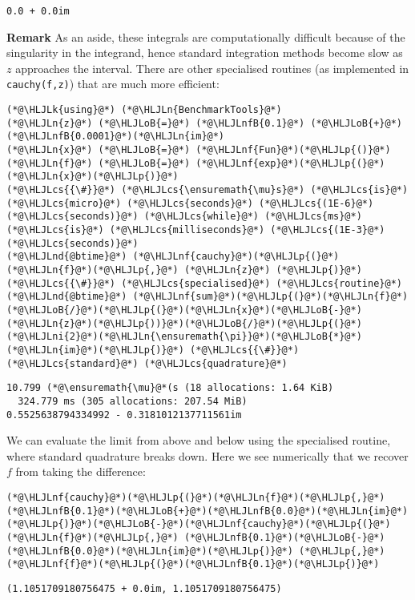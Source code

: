 \documentclass[12pt,a4paper]{article}
\newcommand{\HLJLk}[1]{\textcolor[RGB]{148,91,176}{\textbf{#1}}}
\newcommand{\HLJLn}[1]{#1}
\newcommand{\HLJLnd}[1]{\textcolor[RGB]{214,102,97}{#1}}
\newcommand{\HLJLnf}[1]{\textcolor[RGB]{66,102,213}{#1}}
\newcommand{\HLJLnfB}[1]{\textcolor[RGB]{59,151,46}{#1}}
\newcommand{\HLJLni}[1]{\textcolor[RGB]{59,151,46}{#1}}
\newcommand{\HLJLoB}[1]{\textcolor[RGB]{102,102,102}{\textbf{#1}}}
\newcommand{\HLJLp}[1]{#1}
\newcommand{\HLJLcs}[1]{\textcolor[RGB]{153,153,119}{\textit{#1}}}
\begin{document}
\begin{lstlisting}
0.0 + 0.0im
\end{lstlisting}


\textbf{Remark} As an aside, these integrals are computationally difficult because of the singularity in the integrand, hence standard integration methods become slow as $z$ approaches the interval. There are other specialised routines (as implemented in \texttt{cauchy(f,z)}) that are much more efficient:


\begin{lstlisting}
(*@\HLJLk{using}@*) (*@\HLJLn{BenchmarkTools}@*)
(*@\HLJLn{z}@*) (*@\HLJLoB{=}@*) (*@\HLJLnfB{0.1}@*) (*@\HLJLoB{+}@*)(*@\HLJLnfB{0.0001}@*)(*@\HLJLn{im}@*)
(*@\HLJLn{x}@*) (*@\HLJLoB{=}@*) (*@\HLJLnf{Fun}@*)(*@\HLJLp{()}@*)
(*@\HLJLn{f}@*) (*@\HLJLoB{=}@*) (*@\HLJLnf{exp}@*)(*@\HLJLp{(}@*)(*@\HLJLn{x}@*)(*@\HLJLp{)}@*)
(*@\HLJLcs{{\#}}@*) (*@\HLJLcs{\ensuremath{\mu}s}@*) (*@\HLJLcs{is}@*) (*@\HLJLcs{micro}@*) (*@\HLJLcs{seconds}@*) (*@\HLJLcs{(1E-6}@*) (*@\HLJLcs{seconds)}@*) (*@\HLJLcs{while}@*) (*@\HLJLcs{ms}@*) (*@\HLJLcs{is}@*) (*@\HLJLcs{milliseconds}@*) (*@\HLJLcs{(1E-3}@*) (*@\HLJLcs{seconds)}@*)
(*@\HLJLnd{@btime}@*) (*@\HLJLnf{cauchy}@*)(*@\HLJLp{(}@*)(*@\HLJLn{f}@*)(*@\HLJLp{,}@*) (*@\HLJLn{z}@*) (*@\HLJLp{)}@*) (*@\HLJLcs{{\#}}@*) (*@\HLJLcs{specialised}@*) (*@\HLJLcs{routine}@*)
(*@\HLJLnd{@btime}@*) (*@\HLJLnf{sum}@*)(*@\HLJLp{(}@*)(*@\HLJLn{f}@*)(*@\HLJLoB{/}@*)(*@\HLJLp{(}@*)(*@\HLJLn{x}@*)(*@\HLJLoB{-}@*)(*@\HLJLn{z}@*)(*@\HLJLp{))}@*)(*@\HLJLoB{/}@*)(*@\HLJLp{(}@*)(*@\HLJLni{2}@*)(*@\HLJLn{\ensuremath{\pi}}@*)(*@\HLJLoB{*}@*)(*@\HLJLn{im}@*)(*@\HLJLp{)}@*) (*@\HLJLcs{{\#}}@*) (*@\HLJLcs{standard}@*) (*@\HLJLcs{quadrature}@*)
\end{lstlisting}

\begin{lstlisting}
10.799 (*@\ensuremath{\mu}@*(s (18 allocations: 1.64 KiB)
  324.779 ms (305 allocations: 207.54 MiB)
0.5525638794334992 - 0.3181012137711561im
\end{lstlisting}


We can evaluate the limit from above and below using the specialised routine, where standard quadrature breaks down. Here we see numerically that we recover $f$ from taking the difference:


\begin{lstlisting}
(*@\HLJLnf{cauchy}@*)(*@\HLJLp{(}@*)(*@\HLJLn{f}@*)(*@\HLJLp{,}@*) (*@\HLJLnfB{0.1}@*)(*@\HLJLoB{+}@*)(*@\HLJLnfB{0.0}@*)(*@\HLJLn{im}@*)(*@\HLJLp{)}@*)(*@\HLJLoB{-}@*)(*@\HLJLnf{cauchy}@*)(*@\HLJLp{(}@*)(*@\HLJLn{f}@*)(*@\HLJLp{,}@*) (*@\HLJLnfB{0.1}@*)(*@\HLJLoB{-}@*)(*@\HLJLnfB{0.0}@*)(*@\HLJLn{im}@*)(*@\HLJLp{)}@*) (*@\HLJLp{,}@*) (*@\HLJLnf{f}@*)(*@\HLJLp{(}@*)(*@\HLJLnfB{0.1}@*)(*@\HLJLp{)}@*)
\end{lstlisting}

\begin{lstlisting}
(1.1051709180756475 + 0.0im, 1.1051709180756475)
\end{lstlisting}
\end{document}
